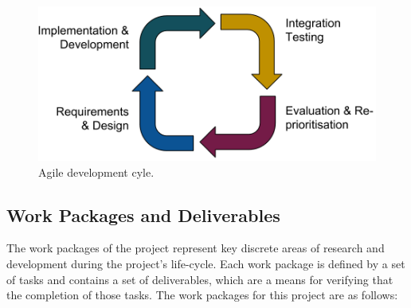 \documentclass[a4paper]{article}
\begin{document}
\begin{figure}[h!]

  \centering
    \includegraphics[scale=0.25]{scrum}
  \caption{Agile development cyle.}
  \label{scrum}
\end{figure}

\subsection{Work Packages and Deliverables}

The work packages of the project represent key discrete areas of research and development during the
project's life-cycle. Each work package is defined by a set of tasks and contains a set of
deliverables, which are a means for verifying that the completion of those tasks. The work packages
for this project are as follows:
\end{document}
